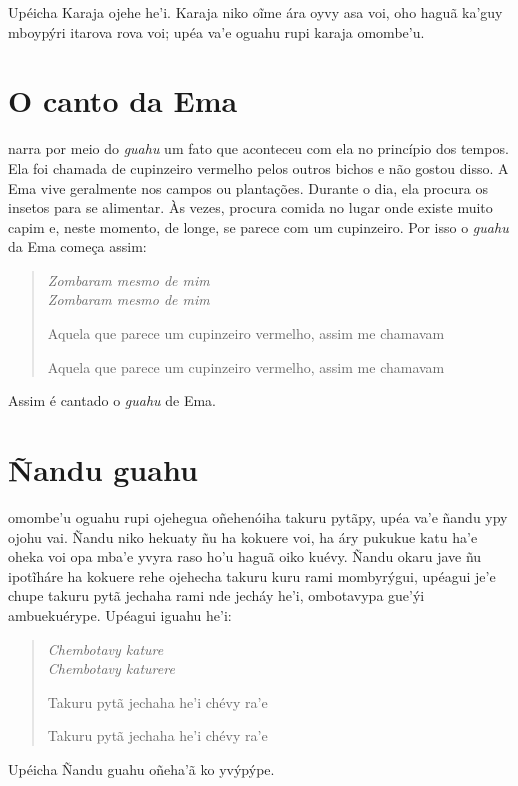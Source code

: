 Upéicha Karaja ojehe he'i. Karaja niko oĩme ára oyvy asa voi, oho haguã
ka'guy mboypýri itarova rova voi; upéa va'e oguahu rupi karaja omombe'u.

\chapter{O canto da Ema}

 narra por meio do \emph{guahu} um fato que aconteceu com ela no
princípio dos tempos. Ela foi chamada de cupinzeiro vermelho pelos
outros bichos e não gostou disso. A Ema vive geralmente nos campos ou
plantações. Durante o dia, ela procura os insetos para se alimentar. Às
vezes, procura comida no lugar onde existe muito capim e, neste momento,
de longe, se parece com um cupinzeiro. Por isso o \emph{guahu} da Ema
começa assim:

\begin{verse}
\itshape
Zombaram mesmo de mim\\
Zombaram mesmo de mim

Aquela que parece um cupinzeiro vermelho, \qb{}assim me chamavam

Aquela que parece um cupinzeiro vermelho, \qb{}assim me chamavam
\end{verse}

Assim é cantado o \emph{guahu} de Ema.

\chapter{Ñandu guahu}

 omombe'u oguahu rupi ojehegua oñehenóiha takuru pytãpy, upéa va'e
ñandu ypy ojohu vai. Ñandu niko hekuaty ñu ha kokuere voi, ha áry
pukukue katu ha'e oheka voi opa mba'e yvyra raso ho'u haguã oiko kuévy.
Ñandu okaru jave ñu ipotĩháre ha kokuere rehe ojehecha takuru kuru rami
mombyrýgui, upéagui je'e chupe takuru pytã jechaha rami nde jecháy he'i,
ombotavypa gue'ýi ambuekuérype. Upéagui iguahu he'i:

\begin{verse}
\itshape
Chembotavy kature\\
Chembotavy katurere

Takuru pytã jechaha he'i chévy ra'e

Takuru pytã jechaha he'i chévy ra'e
\end{verse}

Upéicha Ñandu guahu oñeha'ã ko yvýpýpe.

